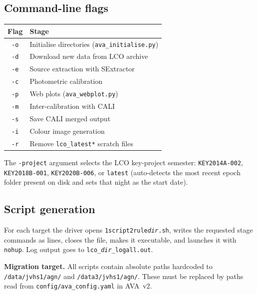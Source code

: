 \documentclass[12pt,a4paper]{article}
\begin{document}
\subsection{Command-line flags}

\begin{center}
\begin{tabular}{cl}
\toprule
Flag & Stage \\
\midrule
\texttt{-o} & Initialise directories (\texttt{ava\_initialise.py}) \\
\texttt{-d} & Download new data from LCO archive \\
\texttt{-e} & Source extraction with SExtractor \\
\texttt{-c} & Photometric calibration \\
\texttt{-p} & Web plots (\texttt{ava\_webplot.py}) \\
\texttt{-m} & Inter-calibration with CALI \\
\texttt{-s} & Save CALI merged output \\
\texttt{-i} & Colour image generation \\
\texttt{-r} & Remove \texttt{lco\_latest*} scratch files \\
\bottomrule
\end{tabular}
\end{center}

The \texttt{-project} argument selects the LCO key-project semester: \texttt{KEY2014A-002},
\texttt{KEY2018B-001}, \texttt{KEY2020B-006}, or \texttt{latest} (auto-detects the most
recent epoch folder present on disk and sets that night as the start date).

\subsection{Script generation}

For each target the driver opens \texttt{1script2rule\textit{dir}.sh}, writes the requested
stage commands as lines, closes the file, makes it executable, and launches it with
\texttt{nohup}.  Log output goes to \texttt{lco\_\textit{dir}\_logall.out}.

\begin{warnbox}
\textbf{Migration target.}  All scripts contain absolute paths hardcoded to
\texttt{/data/jvhs1/agn/} and \texttt{/data3/jvhs1/agn/}.  These must be replaced by
paths read from \texttt{config/ava\_config.yaml} in AVA~v2.
\end{warnbox}

\end{document}
